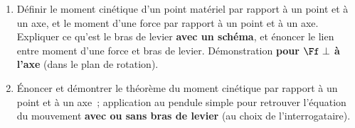 \documentclass[a4paper, 12pt, final, garamond]{book}
\begin{document}
\begin{enumerate}[resume]
	\item Définir le moment cinétique d'un point matériel par rapport à un point
	      et à un axe, et le moment d'une force par rapport à un point et à un
	      axe. Expliquer ce qu'est le bras de levier \textbf{avec un schéma}, et
	      énoncer le lien entre moment d'une force et bras de levier.
	      Démonstration \textbf{pour $\Ff \perp$ à l'axe} (dans le plan de
	      rotation).
	\item Énoncer et démontrer le théorème du moment cinétique par rapport à un
	      point et à un axe~; application au pendule simple pour retrouver
	      l'équation du mouvement \textbf{avec ou sans bras de levier} (au choix
	      de l'interrogataire).
\end{enumerate}
\end{document}
